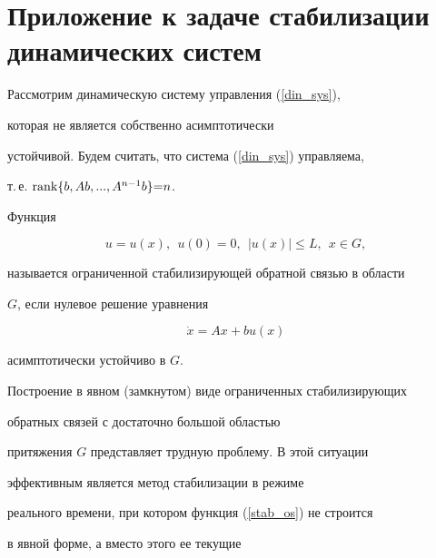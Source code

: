 







\section{Приложение к задаче стабилизации динамических систем}








Рассмотрим динамическую систему управления (\ref{din_sys}),


которая не является собственно асимптотически


устойчивой. Будем считать, что система (\ref{din_sys}) управляема,


т.\,е. $\operatorname{rank} \{ b, Ab, ..., A^{n-1}b \} {=} n$.





Функция


\begin{equation}\label{stab_os}


u = u(x), \ \ u(0) = 0, \ \ |u(x)| \leq L, \ \ x \in G,


\end{equation}


называется ограниченной стабилизирующей обратной связью в области


$G$, если нулевое решение уравнения


\begin{equation}\label{zam_sys_stab}


\dot{x} = Ax + bu(x)


\end{equation}


асимптотически устойчиво в $G$.





Построение в явном (замкнутом) виде ограниченных стабилизирующих


обратных связей с достаточно большой областью


притяжения $G$ представляет трудную проблему. В этой ситуации


эффективным является метод стабилизации в режиме


реального времени, при котором функция (\ref{stab_os}) не строится


в явной форме, а вместо этого ее текущие


